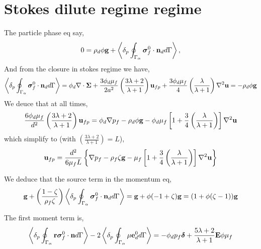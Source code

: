 \documentclass[12pt]{My_preprint}
\begin{document}
\section{Stokes dilute regime regime }

The particle phase eq say, 
\begin{equation*}
    0 
    = 
    \rho_d \phi \textbf{g}
    + \left<\delta_p \oint_{\Gamma_{\alpha}} {\bm{\sigma}_f^0 \cdot \textbf{n}_d} d\Gamma\right>,
\end{equation*}
And from the closure in stokes regime we have, 
\begin{equation*}
    \left<\delta_p \oint_{\Gamma_{\alpha}} \bm{\sigma}_f^0\cdot \textbf{n}_d d\Gamma\right> = 
    \phi_d \mathbf{\nabla}\cdot\bm\Sigma
    + \frac{3\phi_d\mu_f}{2 a^2} 
    \left(\frac{3\lambda+2}{\lambda+1}\right) \textbf{u}_{f p} 
    + \frac{3\phi_d\mu_f}{4} \left(\frac{\lambda}{\lambda+1}\right)\mathbf{\nabla}^2\textbf{u}
    = - 
    \rho_d \phi \textbf{g}
\end{equation*}
We deuce that at all times, 
\begin{align*}
    \frac{6\phi_d\mu_f}{d^2} 
    \left(\frac{3\lambda+2}{\lambda+1}\right) \textbf{u}_{f p} 
    = 
    \phi_d \mathbf{\nabla} p_f
    - \rho_d \phi \textbf{g}
    - \phi_d \mu_f \left[
        1 + \frac{3}{4} \left(\frac{\lambda}{\lambda+1}\right)
    \right]\mathbf{\nabla}^2 \textbf{u}
\end{align*}
which simplify to (with $\left(\frac{3\lambda+2}{\lambda+1}\right) = L$), 
\begin{align*}
   \textbf{u}_{f p} 
    = 
    \frac{d^2}{6\mu_f L }
    \left\{
        \mathbf{\nabla} p_f
        - \rho_f\zeta   \textbf{g}
        -  \mu_f \left[
            1 + \frac{3}{4} \left(\frac{\lambda}{\lambda+1}\right)
            \right]\mathbf{\nabla}^2 \textbf{u}
    \right\}
\end{align*}


We deduce that the source term in the momentum eq, 
\begin{equation*}
    \textbf{g} 
    + \left(\frac{1-\zeta}{\rho_f\zeta}\right)
    \left<\delta_p \oint_{\Gamma_{\alpha}} {\bm{\sigma}_f^0 \cdot \textbf{n}_d} d\Gamma\right>
    =
    \textbf{g}
    +  
    \phi (- 1 + \zeta)
    \textbf{g}
    = (1 + \phi(\zeta-1) )\textbf{g}
\end{equation*}


The first moment term is, 
\begin{equation*}
    \left<\delta_p \oint_{\Gamma_{\alpha}} \textbf{r}\bm{\sigma}_f^0 \cdot \textbf{n} d\Gamma\right> -
    2\left<\delta_p \oint_{\Gamma_{\alpha}} \mu\textbf{e}_d^0 d\Gamma\right> 
    = 
    - \phi_d p_f\bm\delta
    + \frac{5\lambda +2}{\lambda +1}
    \textbf{E} \phi \mu_f
\end{equation*}


\appendix
\end{document}
